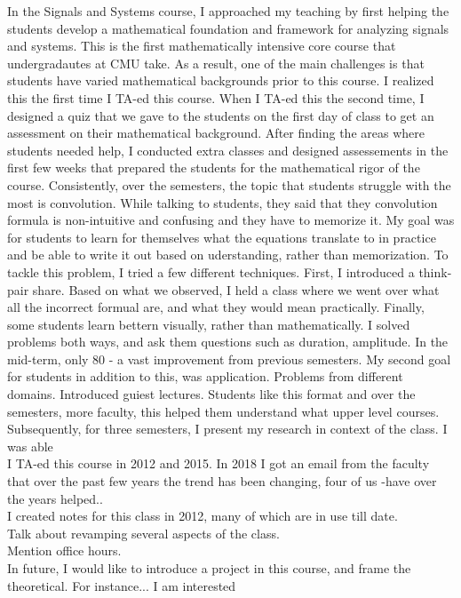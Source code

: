 \documentclass[10pt]{article}
\begin{document}
In the Signals and Systems course, I approached my teaching by first helping the students develop a mathematical foundation and framework for analyzing signals and systems.
This is the first mathematically intensive core course that undergradautes at CMU take. As a result, one of the main challenges is that students have varied mathematical backgrounds prior to this course. I realized this the first time I TA-ed this course. When I TA-ed this the second time, I designed a quiz that we gave to the students on the first day of class to get an assessment on their mathematical background. After finding the areas where students needed help, I conducted extra classes and designed assessements in the first few weeks that prepared the students for the mathematical rigor of the course. Consistently, over the semesters, the topic that students struggle with the most is convolution. While talking to students, they said that they convolution formula is non-intuitive and confusing and they have to memorize it. My goal was for students to learn for themselves what the equations translate to in practice and be able to write it out based on uderstanding, rather than memorization. To tackle this problem, I tried a few different techniques. First, I introduced a think-pair share. Based on what we observed, I held a class where we went over what all the incorrect formual are, and what they would mean practically. Finally, some students learn bettern visually, rather than mathematically. I solved problems both ways, and ask them questions such as duration, amplitude. In the mid-term, only 80 - a vast improvement from previous semesters. My second goal for students in addition to this, was application. Problems from different domains. Introduced guiest lectures. Students like this format and over the semesters, more faculty, this helped them understand what upper level courses. Subsequently, for three semesters, I present my research in context of the class. I was able \\
I TA-ed this course in 2012 and 2015. In 2018 I got an email from the faculty that over the past few years the trend has been changing, four of us -have over the years helped..\\ I created notes for this class in 2012, many of which are in use till date.\\
Talk about revamping several aspects of the class.\\

Mention office hours.\\
In future, I would like to introduce a project in this course, and frame the theoretical. For instance...
I am interested 
\end{document}
